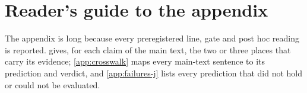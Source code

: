 \section*{Reader's guide to the appendix}
The appendix is long because every preregistered line, gate and post hoc reading is reported.  gives, for each claim of the main text, the two or three places that carry its evidence; \cref{app:crosswalk} maps every main-text sentence to its prediction and verdict, and \cref{app:failures-j} lists every prediction that did not hold or could not be evaluated.

